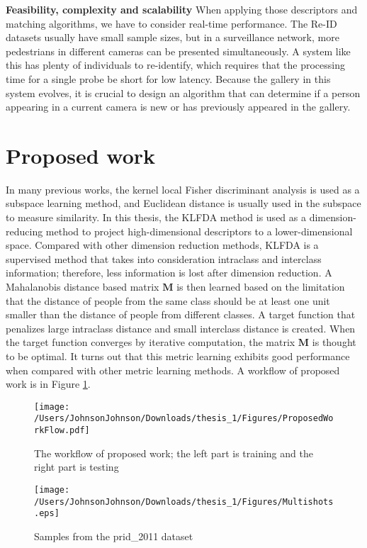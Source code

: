 \textbf{Feasibility, complexity and scalability} When applying those descriptors and matching algorithms, we have to consider real-time performance. The Re-ID datasets usually have small sample sizes, but in a surveillance network, more pedestrians in different cameras can be presented simultaneously. A system like this has plenty of individuals to re-identify, which requires that the processing time for a single probe be short for low latency. Because the gallery in this system evolves, it is crucial to design an algorithm that can determine if a person appearing in a current camera is new or has previously appeared in the gallery.

\section{Proposed work}
In many previous works, the kernel local Fisher discriminant analysis is used as a subspace learning method, and Euclidean distance is usually used in the subspace to measure similarity. In this thesis, the KLFDA \cite{KLFDA} method is used as a dimension-reducing method to project high-dimensional descriptors to a lower-dimensional space. Compared with other dimension reduction methods, KLFDA is a supervised method that takes into consideration intraclass and interclass information; therefore, less information is lost after dimension reduction. A Mahalanobis distance based matrix $\bm{M}$ is then learned based on the limitation that the distance of people from the same class should be at least one unit smaller than the distance of people from different classes. A target function that penalizes large intraclass distance and small interclass distance is created. When the target function converges by iterative computation, the matrix $\bm{M}$ is thought to be optimal. It turns out that this metric learning exhibits good performance when compared with other metric learning methods. A workflow of proposed work is in Figure \ref{ProposedWorkflow}.

\begin{figure}[H]

\texttt{[image: /Users/JohnsonJohnson/Downloads/thesis\_1/Figures/ProposedWorkFlow.pdf]}
\vspace{-2em}
\caption{The workflow of proposed work; the left part is training and the right part is testing}
\label{ProposedWorkflow}

\end{figure}
\begin{figure}[H]

\texttt{[image: /Users/JohnsonJohnson/Downloads/thesis\_1/Figures/Multishots.eps]}
\vspace{-2em}
\caption{Samples from the prid\_2011 dataset}

\end{figure}


